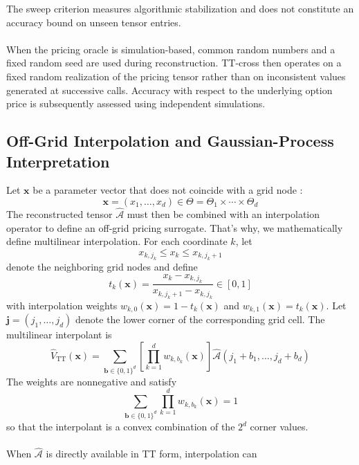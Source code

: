 \documentclass{article}
\numberwithin{equation}{subsection}
\theoremstyle{definition}
\theoremstyle{remark}
\begin{document}
The sweep criterion measures algorithmic stabilization and does not constitute
an accuracy bound on unseen tensor entries.\\
\\
When the pricing oracle is simulation-based, common random numbers and a fixed
random seed are used during reconstruction. TT-cross then operates on a fixed
random realization of the pricing tensor rather than on inconsistent values
generated at successive calls. Accuracy with respect to the underlying option
price is subsequently assessed using independent simulations.
\subsection{Off-Grid Interpolation and Gaussian-Process Interpretation}
\label{subsec:off-grid-interpolation}
Let $\boldsymbol{x}$ be a parameter vector that does not coincide with a grid node :
\begin{equation}
    \boldsymbol{x} = (x_1,\ldots,x_d) \in \Theta = \Theta_1\times\cdots\times\Theta_d
\end{equation}
The reconstructed
tensor $\widehat{\mathcal{A}}$ must then be combined with an interpolation
operator to define an off-grid pricing surrogate.
That's why, we mathematically define multilinear interpolation. 
For each coordinate $k$, let
\[
x_{k,j_k}
\leq
x_k
\leq
x_{k,j_k+1}
\]
denote the neighboring grid nodes and define
\begin{equation}
t_k(\boldsymbol{x}) = \frac{x_k-x_{k,j_k}} {x_{k,j_k+1}-x_{k,j_k}} \in[0,1]
\end{equation}
with interpolation weights $w_{k,0}(\boldsymbol{x}) = 1-t_k(\boldsymbol{x})$ and  $w_{k,1}(\boldsymbol{x}) = t_k(\boldsymbol{x})$.  Let $\boldsymbol{j} = (j_1,\ldots,j_d)$ denote the lower corner of the corresponding grid cell. The multilinear interpolant is
\begin{equation}
\widehat{V}_{\mathrm{TT}}(\boldsymbol{x}) = \sum_{\boldsymbol{b}\in\{0,1\}^d} \left[ \prod_{k=1}^{d} w_{k,b_k}(\boldsymbol{x}) \right] \widehat{\mathcal{A}} (j_1+b_1,\ldots,j_d+b_d)
\end{equation}
The weights are nonnegative and satisfy
\begin{equation}
\sum_{\boldsymbol{b}\in\{0,1\}^d} \prod_{k=1}^{d} w_{k,b_k}(\boldsymbol{x}) = 1
\end{equation}
so that the interpolant is a convex combination of the $2^d$ corner values. \\
\\
When $\widehat{\mathcal{A}}$ is directly available in TT form, interpolation can
\end{document}
